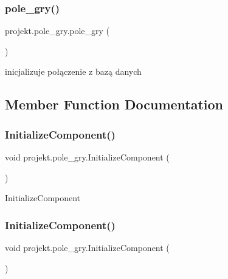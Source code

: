 \subsubsection{\texorpdfstring{pole\+\_\+gry()}{pole\_gry()}}
{\footnotesize\ttfamily projekt.\+pole\+\_\+gry.\+pole\+\_\+gry (\begin{DoxyParamCaption}{ }\end{DoxyParamCaption})\hspace{0.3cm}{\ttfamily [inline]}}



inicjalizuje połączenie z bazą danych 



\subsection{Member Function Documentation}
\mbox{\label{classprojekt_1_1pole__gry_acb91309f48624fdcd50a6f023a810f02}} 
\subsubsection{\texorpdfstring{Initialize\+Component()}{InitializeComponent()}\hspace{0.1cm}{\footnotesize\ttfamily [1/9]}}
{\footnotesize\ttfamily void projekt.\+pole\+\_\+gry.\+Initialize\+Component (\begin{DoxyParamCaption}{ }\end{DoxyParamCaption})\hspace{0.3cm}{\ttfamily [inline]}}



Initialize\+Component 

\mbox{\label{classprojekt_1_1pole__gry_acb91309f48624fdcd50a6f023a810f02}} 
\subsubsection{\texorpdfstring{Initialize\+Component()}{InitializeComponent()}\hspace{0.1cm}{\footnotesize\ttfamily [2/9]}}
{\footnotesize\ttfamily void projekt.\+pole\+\_\+gry.\+Initialize\+Component (\begin{DoxyParamCaption}{ }\end{DoxyParamCaption})\hspace{0.3cm}{\ttfamily [inline]}}



